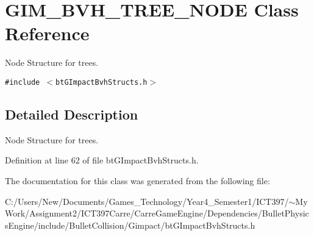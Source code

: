 \hypertarget{class_g_i_m___b_v_h___t_r_e_e___n_o_d_e}{
\section{GIM\_\-BVH\_\-TREE\_\-NODE Class Reference}
\label{class_g_i_m___b_v_h___t_r_e_e___n_o_d_e}
}
Node Structure for trees.  


{\tt \#include $<$btGImpactBvhStructs.h$>$}



\subsection{Detailed Description}
Node Structure for trees. 

Definition at line 62 of file btGImpactBvhStructs.h.

The documentation for this class was generated from the following file:\begin{CompactItemize}
\item 
C:/Users/New/Documents/Games\_\-Technology/Year4\_\-Semester1/ICT397/$\sim$My Work/Assignment2/ICT397Carre/CarreGameEngine/Dependencies/BulletPhysicsEngine/include/BulletCollision/Gimpact/btGImpactBvhStructs.h\end{CompactItemize}
